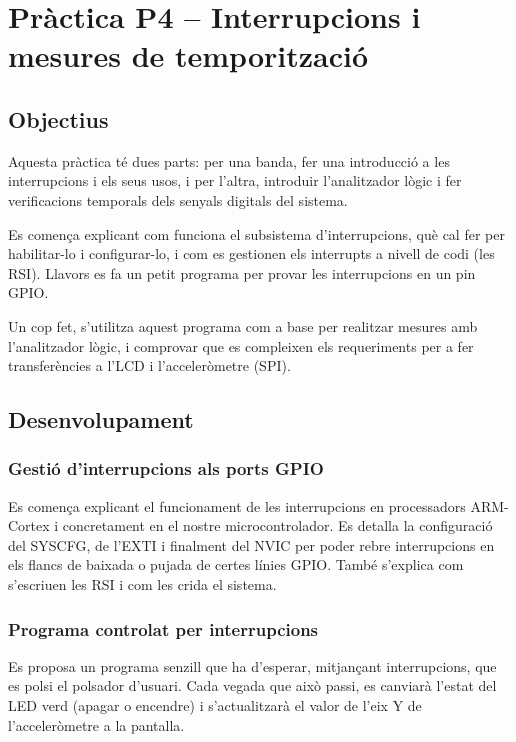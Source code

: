 \chapter{\label{ch:p4} Pràctica P4 -- Interrupcions i mesures de temporització}

\section{Objectius}

Aquesta pràctica té dues parts: per una banda, fer una introducció a les interrupcions
i els seus usos, i per l'altra, introduir l'analitzador lògic i fer verificacions
temporals dels senyals digitals del sistema.

Es comença explicant com funciona el subsistema d'interrupcions, què cal fer per
habilitar-lo i configurar-lo, i com es gestionen els interrupts a nivell de codi (les RSI).
Llavors es fa un petit programa per provar les interrupcions en un pin GPIO.

Un cop fet, s'utilitza aquest programa com a base per realitzar mesures amb l'analitzador
lògic, i comprovar que es compleixen els requeriments per a fer transferències a l'LCD
i l'acceleròmetre (SPI).

\section{Desenvolupament}


\subsection{Gestió d'interrupcions als ports GPIO}

Es comença explicant el funcionament de les interrupcions en processadors ARM-Cortex
i concretament en el nostre microcontrolador. Es detalla la configuració del SYSCFG,
de l'EXTI i finalment del NVIC per poder rebre interrupcions en els flancs de baixada
o pujada de certes línies GPIO. També s'explica com s'escriuen les RSI i com les
crida el sistema.


\subsection{Programa controlat per interrupcions}

Es proposa un programa senzill que ha d'esperar, mitjançant interrupcions, que es polsi
el polsador d'usuari. Cada vegada que això passi, es canviarà l'estat del LED verd
(apagar o encendre) i s'actualitzarà el valor de l'eix Y de l'acceleròmetre a la pantalla.

